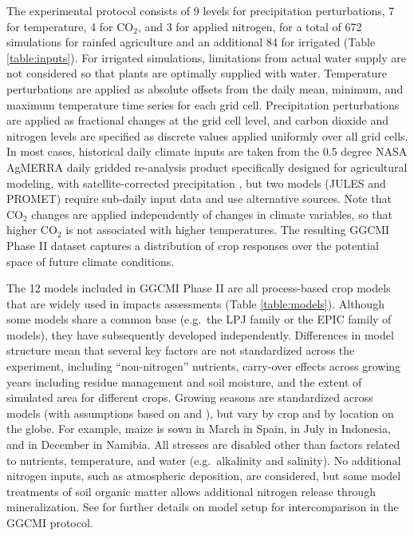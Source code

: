 \documentclass[esd, manuscript]{copernicus} %
\begin{document}
The experimental protocol consists of 9 levels for precipitation perturbations, 7 for temperature, 4 for CO$_2$, and 3 for applied nitrogen, for a total of 672 simulations for rainfed agriculture and an additional 84 for irrigated (Table \ref{table:inputs}). For irrigated simulations, limitations from actual water supply are not considered so that plants are optimally supplied with water. Temperature perturbations are applied as absolute offsets from the daily mean, minimum, and maximum temperature time series for each grid cell. Precipitation perturbations are applied as fractional changes at the grid cell level, and carbon dioxide and nitrogen levels are specified as discrete values applied uniformly over all grid cells. In most cases, historical daily climate inputs are taken from the 0.5 degree NASA AgMERRA daily gridded re-analysis product specifically designed for agricultural modeling, with satellite-corrected precipitation \citep{Ruane2015}, but two models (JULES and PROMET) require sub-daily input data and use alternative sources. Note that CO$_2$ changes are applied independently of changes in climate variables, so that higher CO$_2$ is not associated with higher temperatures. The resulting GGCMI Phase II dataset captures a distribution of crop responses over the potential space of future climate conditions.


The 12 models included in GGCMI Phase II are all process-based crop models that are widely used in impacts assessments (Table \ref{table:models}). Although some models share a common base (e.g.\ the LPJ family or the EPIC family of models), they have subsequently developed independently. Differences in model structure mean that several key factors are not standardized across the experiment, including ``non-nitrogen'' nutrients, carry-over effects across growing years including residue management and soil moisture, and the extent of simulated area for different crops. Growing seasons are standardized across models (with assumptions based on \citet{Sacks2010} and \citet{Portmann2008, Portmann2010}), but vary by crop and by location on the globe. For example, maize is sown in March in Spain, in July in Indonesia, and in December in Namibia. All stresses are disabled other than factors related to nutrients, temperature, and water (e.g.\ alkalinity and salinity). No additional nitrogen inputs, such as atmospheric deposition, are considered, but some model treatments of soil organic matter allows additional nitrogen release through mineralization. See \citet{Elliott2015} for further details on model setup for intercomparison in the GGCMI protocol. 
\end{document}

